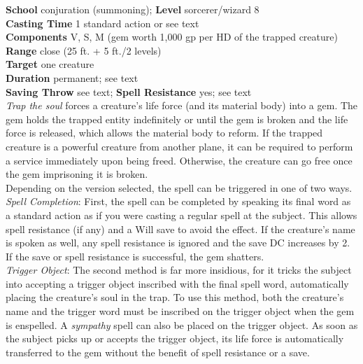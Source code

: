 \textbf{School} conjuration (summoning); \textbf{Level} sorcerer/wizard 8\\
\textbf{Casting Time} 1 standard action or see text\\
\textbf{Components} V, S, M (gem worth 1,000 gp per HD of the trapped creature)\\
\textbf{Range} close (25 ft. + 5 ft./2 levels)\\
\textbf{Target} one creature\\
\textbf{Duration} permanent; see text\\
\textbf{Saving Throw} see text; \textbf{Spell Resistance} yes; see text\\
\textit{Trap the soul }forces a creature's life force (and its material body) into a gem. The gem holds the trapped entity indefinitely or until the gem is broken and the life force is released, which allows the material body to reform. If the trapped creature is a powerful creature from another plane, it can be required to perform a service immediately upon being freed. Otherwise, the creature can go free once the gem imprisoning it is broken.\\
Depending on the version selected, the spell can be triggered in one of two ways.\\
\textit{Spell Completion}: First, the spell can be completed by speaking its final word as a standard action as if you were casting a regular spell at the subject. This allows spell resistance (if any) and a Will save to avoid the effect. If the creature's name is spoken as well, any spell resistance is ignored and the save DC increases by 2. If the save or spell resistance is successful, the gem shatters.\\
\textit{Trigger Object}: The second method is far more insidious, for it tricks the subject into accepting a trigger object inscribed with the final spell word, automatically placing the creature's soul in the trap. To use this method, both the creature's name and the trigger word must be inscribed on the trigger object when the gem is enspelled. A \textit{sympathy }spell can also be placed on the trigger object. As soon as the subject picks up or accepts the trigger object, its life force is automatically transferred to the gem without the benefit of spell resistance or a save.\\
